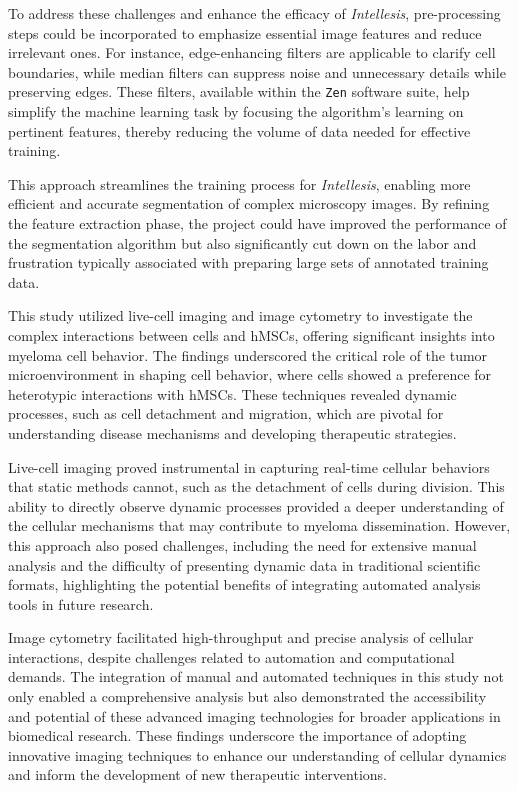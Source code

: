 To address these challenges and enhance the efficacy of \textit{Intellesis},
pre-processing steps could be incorporated to emphasize essential image features
and reduce irrelevant ones. For instance, edge-enhancing filters are applicable to
clarify cell boundaries, while median filters can suppress noise and
unnecessary details while preserving edges. These filters, available within the \texttt{Zen} software
suite, help simplify the machine learning task by focusing the algorithm’s
learning on pertinent features, thereby reducing the volume of data needed for
effective training.

This approach streamlines the training process for \textit{Intellesis}, enabling
more efficient and accurate segmentation of complex microscopy images. By
refining the feature extraction phase, the project could have improved the
performance of the segmentation algorithm but also significantly cut down on the
labor and frustration typically associated with preparing large sets of
annotated training data.





%
\label{sec:discussion_conclusion_microscopy}%
This study utilized live-cell imaging and image cytometry to investigate the
complex interactions between \INA cells and hMSCs, offering significant insights
into myeloma cell behavior. The findings underscored the critical role of the
tumor microenvironment in shaping cell behavior, where \INA cells showed a
preference for heterotypic interactions with hMSCs. These techniques revealed
dynamic processes, such as cell detachment and migration, which are pivotal for
understanding disease mechanisms and developing therapeutic strategies.

Live-cell imaging proved instrumental in capturing real-time cellular behaviors
that static methods cannot, such as the detachment of \INA cells during
division. This ability to directly observe dynamic processes provided a deeper
understanding of the cellular mechanisms that may contribute to myeloma
dissemination. However, this approach also posed challenges, including the need
for extensive manual analysis and the difficulty of presenting dynamic data in
traditional scientific formats, highlighting the potential benefits of
integrating automated analysis tools in future research.

Image cytometry facilitated high-throughput and precise analysis of cellular
interactions, despite challenges related to automation and computational
demands. The integration of manual and automated techniques in this study not
only enabled a comprehensive analysis but also demonstrated the accessibility
and potential of these advanced imaging technologies for broader applications in
biomedical research. These findings underscore the importance of adopting
innovative imaging techniques to enhance our understanding of cellular dynamics
and inform the development of new therapeutic interventions.



